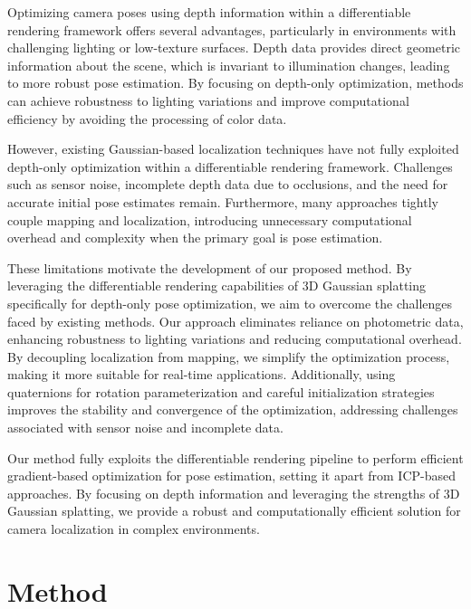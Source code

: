 \documentclass[twocolumn]{article} %
\begin{document}
Optimizing camera poses using depth information within a differentiable
rendering framework offers several advantages, particularly in
environments with challenging lighting or low-texture surfaces. Depth
data provides direct geometric information about the scene, which is
invariant to illumination changes, leading to more robust pose
estimation. By focusing on depth-only optimization, methods can achieve
robustness to lighting variations and improve computational efficiency
by avoiding the processing of color data.

However, existing Gaussian-based localization techniques have not fully
exploited depth-only optimization within a differentiable rendering
framework. Challenges such as sensor noise, incomplete depth data due to
occlusions, and the need for accurate initial pose estimates remain.
Furthermore, many approaches tightly couple mapping and localization,
introducing unnecessary computational overhead and complexity when the
primary goal is pose estimation.

These limitations motivate the development of our proposed method. By
leveraging the differentiable rendering capabilities of 3D Gaussian
splatting specifically for depth-only pose optimization, we aim to
overcome the challenges faced by existing methods. Our approach
eliminates reliance on photometric data, enhancing robustness to
lighting variations and reducing computational overhead. By decoupling
localization from mapping, we simplify the optimization process, making
it more suitable for real-time applications. Additionally, using
quaternions for rotation parameterization
\cite{kuipersQuaternionsRotationSequences1999} and careful
initialization strategies improves the stability and convergence of the
optimization, addressing challenges associated with sensor noise and
incomplete data.

Our method fully exploits the differentiable rendering pipeline to
perform efficient gradient-based optimization for pose estimation,
setting it apart from ICP-based approaches. By focusing on depth
information and leveraging the strengths of 3D Gaussian splatting, we
provide a robust and computationally efficient solution for camera
localization in complex environments.

\section{Method}\label{method}
\end{document}
